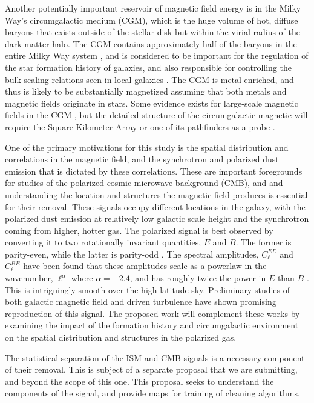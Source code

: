 Another potentially important reservoir of  magnetic field energy is in the Milky Way's
circumgalactic medium (CGM), which is the huge volume of hot, diffuse
baryons that exists outside of the stellar disk but within the virial
radius of the dark matter halo.  The CGM  contains approximately half
of the baryons in the entire Milky Way system \citep[see,
e.g.,][]{2014ApJ...786...54P}, and is considered to be important for
the regulation of the star formation history of galaxies, and also responsible for
controlling the bulk scaling relations  seen in local galaxies
\citep{2015ApJ...808L..30V,2017ApJ...845...80V}.  The CGM is
metal-enriched, and thus is likely to be
substantially magnetized assuming that both metals and magnetic fields
originate in stars.  Some evidence exists for large-scale
magnetic fields in the CGM \citep[see,
e.g., Figure 7 in][]{2017ARA&A..55..111H}, but the detailed structure
of the circumgalactic magnetic will require the Square Kilometer Array
or one of its pathfinders as a probe \citep{2015aska.confE..41H}.

One of the primary motivations for this study is the spatial distribution and
correlations in the magnetic field, and the synchrotron and polarized dust
emission that is dictated by these correlations.  These are important
foregrounds for studies of the polarized cosmic microwave background (CMB), and
and understanding the location and structures the magnetic field produces is
essential for their removal.  These signals occupy different
locations in the galaxy, with the polarized dust emission at relatively low
galactic scale height and the synchrotron coming from higher, hotter gas.  
The polarized signal is best observed by converting it to two rotationally
invariant quantities, $E$ and $B$.  The former is parity-even, while the latter
is parity-odd \citep{Seljak97,Seljak97b,Kamionkowski97}. The spectral
amplitudes, $C_\ell^{EE}$ and $C_\ell^{BB}$ have been found 
that these amplitudes scale as a powerlaw in the wavenumber, $\ell^\alpha$ where
$\alpha=-2.4$, and has roughly twice the power in $E$ than $B$ \citep{Planck2016,Planck2018}.  This is
intriguingly smooth over the high-latitude sky.  Preliminary studies of both
galactic magnetic field \citep{Kim19} and driven turbulence \citep{Kritsuk19}
 have shown promising reproduction of this signal.  The proposed work will complement these works by
examining the impact of the formation history and circumgalactic environment on
the spatial distribution and structures in the polarized gas.  

The statistical separation of the ISM and CMB signals is a necessary component
of their removal.
This is subject of a separate
proposal that we are submitting, and beyond the scope of this one.  This
proposal seeks to understand the components of the signal, and provide maps for
training of cleaning algorithms. 


